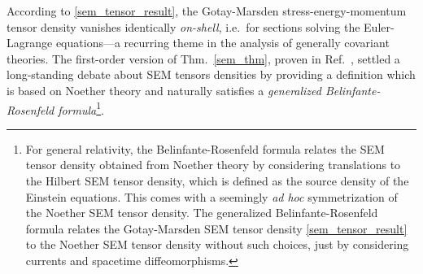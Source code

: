 According to \eqref{sem_tensor_result}, the Gotay-Marsden stress-energy-momentum tensor density vanishes identically \emph{on-shell}, i.e.\ for sections solving the Euler-Lagrange equations---a recurring theme in the analysis of generally covariant theories. The first-order version of Thm.\ \ref{sem_thm}, proven in Ref.\ \cite{Gotay_1992}, settled a long-standing debate about SEM tensors densities by providing a definition which is based on Noether theory and naturally satisfies a \emph{generalized Belinfante-Rosenfeld formula}\footnote{For general relativity, the Belinfante-Rosenfeld formula \cite{Belinfante_1940,Rosenfeld_1940} relates the SEM tensor density obtained from Noether theory by considering translations to the Hilbert SEM tensor density, which is defined as the source density of the Einstein equations. \cite{Gotay_1992} This comes with a seemingly \emph{ad hoc} symmetrization of the Noether SEM tensor density. The generalized Belinfante-Rosenfeld formula \cite{Gotay_1992} relates the Gotay-Marsden SEM tensor density \eqref{sem_tensor_result} to the Noether SEM tensor density without such choices, just by considering currents and spacetime diffeomorphisms.}.

